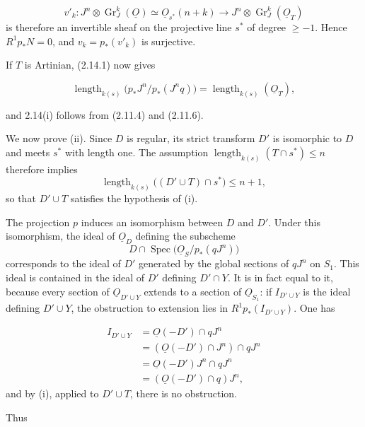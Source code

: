 \begin{equation*}
v'_k:J^n\otimes\operatorname{Gr}_J^k(\underline{O})
\simeq\underline{O}_{s^*}(n+k)
\longrightarrow
J^n\otimes\operatorname{Gr}_J^k(\underline{O}_T)
\end{equation*}
is therefore an invertible sheaf on the projective line $s^*$ of degree
$\geq-1$.  Hence $R^1p_*N=0$, and $v_k=p_*(v'_k)$ is surjective.

If $T$ is Artinian, (2.14.1) now gives

\begin{equation*}
\operatorname{length}_{k(s)}
\bigl(p_*J^n/p_*(J^nq)\bigr)
=\operatorname{length}_{k(s)}(\underline{O}_T),
\end{equation*}


and 2.14(i) follows from (2.11.4) and (2.11.6).

We now prove (ii).  Since $D$ is regular, its strict transform $D'$ is
isomorphic to $D$ and meets $s^*$ with length one.  The assumption
$\operatorname{length}_{k(s)}(T\cap s^*)\leq n$ therefore implies
\[
\operatorname{length}_{k(s)}\bigl((D'\cup T)\cap s^*\bigr)\leq n+1,
\]
so that $D'\cup T$ satisfies the hypothesis of (i).

The projection $p$ induces an isomorphism between $D$ and $D'$.  Under this
isomorphism, the ideal of $\underline{O}_D$ defining the subscheme
\[
D\cap\operatorname{Spec}\bigl(\underline{O}_S/p_*(qJ^n)\bigr)
\]
corresponds to the ideal of $D'$ generated by the global sections of $qJ^n$ on
$S_1$.  This ideal is contained in the ideal of $D'$ defining $D'\cap Y$.
It is in fact equal to it, because every section of
$\underline{O}_{D'\cup Y}$ extends to a section of $\underline{O}_{S_1}$:
if $I_{D'\cup Y}$ is the ideal defining $D'\cup Y$, the obstruction to
extension lies in $R^1p_*(I_{D'\cup Y})$.  One has

\begin{equation*}
\begin{aligned}
I_{D'\cup Y}
&=\underline{O}(-D')\cap qJ^n\\
&=(\underline{O}(-D')\cap J^n)\cap qJ^n\\
&=\underline{O}(-D')J^n\cap qJ^n\\
&=(\underline{O}(-D')\cap q)J^n,
\end{aligned}
\end{equation*}
and by (i), applied to $D'\cup T$, there is no obstruction.

Thus

